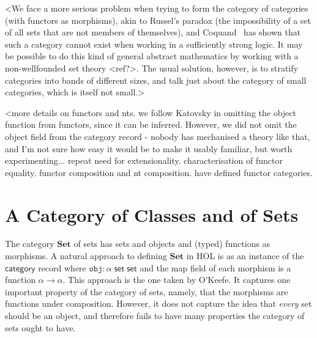 \documentclass[twoside,titlepage,11pt]{article}
\begin{document}
<We face a more serious problem when trying to form the category of categories (with functors as morphisms), akin to Russel's paradox (the impossibility of a set of all sets that are not members of themselves), and Coquand~\cite{DBLP:conf/lics/Coquand86} has shown that such a category cannot exist when working in a sufficiently strong logic.
It may be possible to do this kind of general abstract mathematics by working with a non-wellfounded set theory <ref?>.
The usual solution, however, is to stratify categories into bands of different sizes, and talk just about the category of small categories, which is itself not small.>

<more details on functors and nts. we follow Katovsky in omitting the object function from functors, since it can be inferred. However, we did not omit the object field from the category record - nobody has mechanised a theory like that, and I'm not sure how easy it would be to make it usably familiar, but worth experimenting...
repeat need for extensionality. characterisation of functor equality. functor composition and nt composition. have defined functor categories.
\section{A Category of Classes and of Sets}%
\newcommand{\Set}{\ensuremath{\mathbf{Set}}}
The category $\Set$ of sets has sets and objects and (typed) functions as morphisms.
A natural approach to defining $\Set$ in HOL is as an instance of the $\mathsf{category}$ record where $\mathtt{obj}:\alpha\;\mathsf{set}\;\mathsf{set}$ and the map field of each morphism is a function $\alpha\to\alpha$.
This approach is the one taken by O'Keefe.
It captures one important property of the category of sets, namely, that the morphisms are functions under composition.
However, it does not capture the idea that \emph{every} set should be an object, and therefore fails to have many properties the category of sets ought to have.
\end{document}
